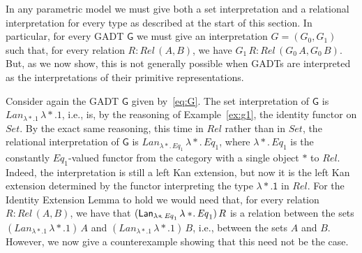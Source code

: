 \documentclass[acmsmall,screen,review,anonymous]{acmart}
\theoremstyle{definition}
\begin{document}
\begin{example}\label{ex:prim-par}
In any parametric model we must give both a set interpretation and a
relational interpretation for every type as described at the start of
this section. In particular, for every GADT $\mathsf{G}$ we must give
an interpretation $G = (G_0,G_1)$ such that, for every relation $R :
\mathit{Rel}\,(A, B)$, we have $G_1\,R : \mathit{Rel}\,(G_0\,A,
G_0\,B)$. But, as we now show, this is not generally possible when
GADTs are interpreted as the interpretations of their primitive
representations.

Consider again the GADT $\mathsf{G}$ given by~\eqref{eq:G}. The set
interpretation of $\mathsf{G}$ is $\mathit{Lan}_{\lambda
  *\!. 1}\,\lambda *\!. 1$, i.e., is, by the reasoning of
Example~\ref{ex:g1}, the identity functor on $\mathit{Set}$. By the
exact same reasoning, this time in $\mathit{Rel}$ rather than in
$\mathit{Set}$, the relational interpretation of $\mathsf{G}$ is
$\mathit{Lan}_{\lambda *\!.\,\mathit{Eq}_1} \,\lambda
*\!.\,\mathit{Eq}_1$, where $\lambda *\!.\,\mathit{Eq}_1$ is the
constantly $\mathit{Eq}_1$-valued functor from the category with a
single object $*$ to $\mathit{Rel}$.  Indeed, the interpretation is
still a left Kan extension, but now it is the left Kan extension
determined by the functor interpreting the type $\mathsf{\lambda
  *\!. 1}$ in $\mathit{Rel}$. For the Identity Extension Lemma to hold
we would need that, for every relation $R : \mathit{Rel}\,(A, B)$, we
have that $(\mathit{\mathsf{Lan}}_{\lambda *\!.\,\mathit{Eq}_1} \,\lambda
*\!.\,\mathit{Eq}_1)\, R$ is a relation between the sets
$(\mathit{Lan}_{\lambda *. 1}\,\lambda *\!. 1)\, A$ and
$(\mathit{Lan}_{\lambda *. 1}\,\lambda *\!. 1)\,B$, i.e., between the
sets $A$ and $B$. However, we now give a counterexample showing that
this need not be the case.


\end{example}
\end{document}
